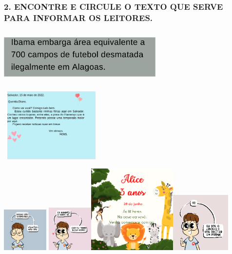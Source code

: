 \subsubsection{2. ENCONTRE E CIRCULE O TEXTO QUE SERVE PARA INFORMAR OS
LEITORES.
}\label{encontre-e-circule-o-texto-que-serve-para-informar-os-leitores.}

\includegraphics[width=3.23889in,height=1.08958in]{media/image141.png}

\includegraphics[width=2.03472in,height=1.44444in]{media/image142.png}

\includegraphics[width=0.90835in,height=0.87172in]{media/image143.png}
\includegraphics[width=0.90912in,height=0.90912in]{media/image145.png}\includegraphics[width=1.74653in,height=1.74653in]{media/image147.png}\includegraphics[width=1.18333in,height=1.18333in]{media/image152.png}

